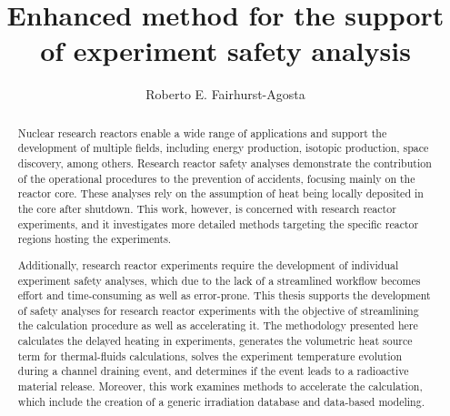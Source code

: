 \documentclass{uiucthesis2021}
\begin{document}
\title{Enhanced method for the support of experiment safety analysis}
\author{Roberto E. Fairhurst-Agosta}
\phdthesis
{}
\maketitle

\frontmatter

\begin{abstract}

Nuclear research reactors enable a wide range of applications and support the development of multiple fields, including energy production, isotopic production, space discovery, among others.
Research reactor safety analyses demonstrate the contribution of the operational procedures to the prevention of accidents, focusing mainly on the reactor core.
These analyses rely on the assumption of heat being locally deposited in the core after shutdown.
This work, however, is concerned with research reactor experiments, and it investigates more detailed methods targeting the specific reactor regions hosting the experiments.


Additionally, research reactor experiments require the development of individual experiment safety analyses, which due to the lack of a streamlined workflow becomes effort and time-consuming as well as error-prone.
This thesis supports the development of safety analyses for research reactor experiments with the objective of streamlining the calculation procedure as well as accelerating it.
The methodology presented here calculates the delayed heating in experiments, generates the volumetric heat source term for thermal-fluids calculations, solves the experiment temperature evolution during a channel draining event, and determines if the event leads to a radioactive material release.
Moreover, this work examines methods to accelerate the calculation, which include the creation of a generic irradiation database and data-based modeling.


\end{abstract}
\end{document}

